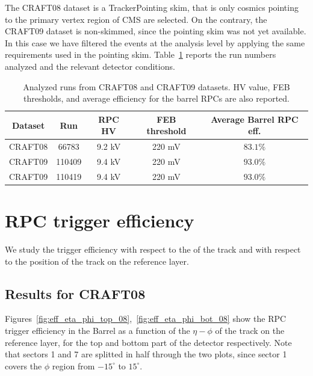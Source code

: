 The CRAFT08 dataset is a TrackerPointing skim, that is 
only cosmics pointing to the primary vertex 
region of CMS are selected. 
On the contrary, the CRAFT09 dataset is non-skimmed, 
since the pointing skim was not yet 
available. In this case we have filtered the 
events at the analysis level by applying the same
requirements used in the pointing skim.
Table~\ref{tab:runs} reports the run numbers analyzed and the 
relevant detector conditions.

 \begin{table}[htb]
    \begin{center}
      \begin{tabular}{|c|c|c|c|c|} \hline
Dataset & Run   & RPC HV & FEB threshold & Average Barrel RPC eff.\\ \hline
CRAFT08 & 66783 & 9.2 kV & 220 mV & $83.1\%$ \\ \hline
CRAFT09 & 110409  & 9.4 kV & 220 mV & $93.0\%$ \\ \hline
CRAFT09 & 110419  & 9.4 kV & 220 mV & $93.0\%$ \\ \hline
      \end{tabular}
      \caption{Analyzed runs from CRAFT08 
and CRAFT09 datasets. HV value, FEB thresholds, and average
efficiency for the barrel RPCs are also reported.}
    \label{tab:runs}
    \end{center}
  \end{table}

\section{RPC trigger efficiency}
\label{resultSection}


We study the trigger efficiency with respect to the \pt of the track and 
with respect to the position of the track on the reference layer.

\subsection{Results for CRAFT08}
\label{eff_08}
Figures~\ref{fig:eff_eta_phi_top_08},~\ref{fig:eff_eta_phi_bot_08} show 
the RPC trigger efficiency in the Barrel as a function of the 
$\eta - \phi$ of the track on the reference layer, for the top 
and bottom part of the detector respectively. 
Note that sectors 1 and 7 are splitted in half through the 
two plots, since sector 1 covers the $\phi$
region from $-15^\circ$ to $15^\circ$.

